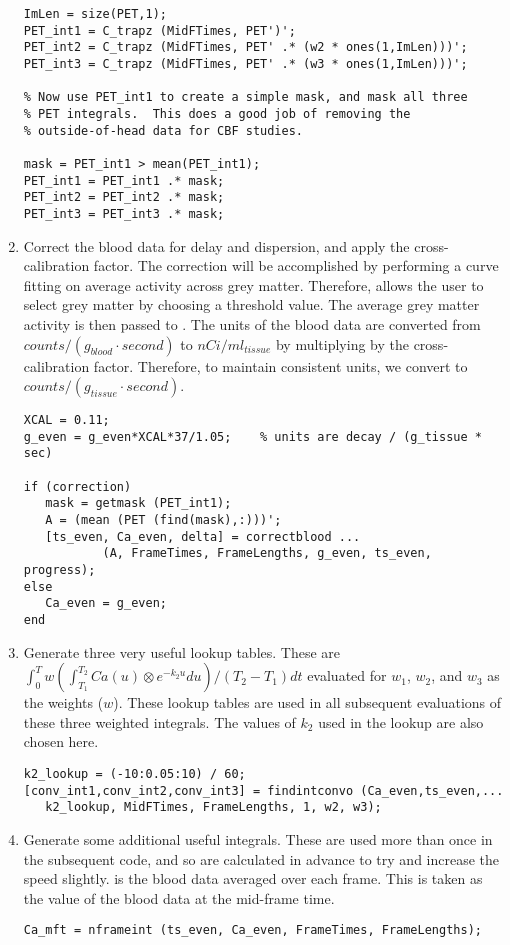 \begin{enumerate}
\begin{verbatim}
ImLen = size(PET,1);
PET_int1 = C_trapz (MidFTimes, PET')';
PET_int2 = C_trapz (MidFTimes, PET' .* (w2 * ones(1,ImLen)))';
PET_int3 = C_trapz (MidFTimes, PET' .* (w3 * ones(1,ImLen)))';

% Now use PET_int1 to create a simple mask, and mask all three
% PET integrals.  This does a good job of removing the
% outside-of-head data for CBF studies.

mask = PET_int1 > mean(PET_int1);
PET_int1 = PET_int1 .* mask;
PET_int2 = PET_int2 .* mask;
PET_int3 = PET_int3 .* mask;
\end{verbatim}

\item Correct the blood data for delay and dispersion, and apply the
cross-calibration factor.  The correction will be accomplished by
performing a curve fitting on average activity across grey matter.
Therefore,  allows the user to select grey matter by
choosing a threshold value.  The average grey matter activity is then
passed to .  The units of the blood data are
converted from $counts / (g_{blood} \cdot second)$ to $nCi /
ml_{tissue}$ by multiplying by the cross-calibration factor.
Therefore, to maintain consistent units, we convert to $counts /
(g_{tissue} \cdot second)$.

\begin{verbatim}
XCAL = 0.11;
g_even = g_even*XCAL*37/1.05;    % units are decay / (g_tissue * sec)

if (correction)
   mask = getmask (PET_int1);
   A = (mean (PET (find(mask),:)))';
   [ts_even, Ca_even, delta] = correctblood ...
           (A, FrameTimes, FrameLengths, g_even, ts_even, progress);
else
   Ca_even = g_even;
end
\end{verbatim}

\item Generate three very useful lookup tables.  These are
$\int_{0}^{T} w (\int_{T_1}^{T_2} Ca(u) \otimes e^{-k_{2}u} du)/(T_2
- T_1) dt$ evaluated for $w_1$, $w_2$, and $w_3$ as the weights
($w$).  These lookup tables are used in all subsequent evaluations of
these three weighted integrals.  The values of $k_2$ used in the
lookup are also chosen here.
\begin{verbatim}
k2_lookup = (-10:0.05:10) / 60;
[conv_int1,conv_int2,conv_int3] = findintconvo (Ca_even,ts_even,...
   k2_lookup, MidFTimes, FrameLengths, 1, w2, w3);
\end{verbatim}

\item Generate some additional useful integrals.  These are used more
than once in the subsequent code, and so are calculated in advance to
try and increase the speed slightly.   is the blood
data averaged over each frame.  This is taken as the value of the
blood data at the mid-frame time.
\begin{verbatim}
Ca_mft = nframeint (ts_even, Ca_even, FrameTimes, FrameLengths);      


\end{verbatim}
\end{enumerate}
